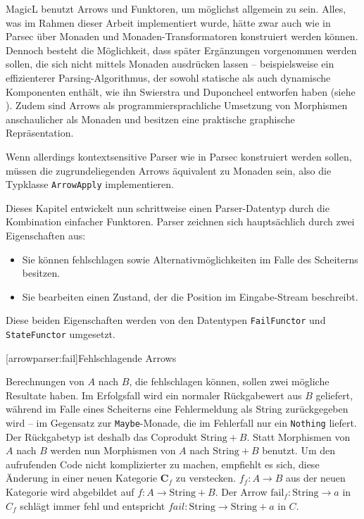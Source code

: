 \documentclass[11pt, a4paper, bibgerm]{scrbook}
\newcommand\icode[1]{\lstinline?#1?}
\newcommand\lsection{}
\begin{document}
MagicL benutzt Arrows und Funktoren, um möglichst allgemein zu
sein. Alles, was im Rahmen dieser Arbeit implementiert wurde, hätte zwar
auch wie in Parsec über Monaden und Monaden-Transformatoren konstruiert
werden können. Dennoch besteht die Möglichkeit, dass später Ergänzungen
vorgenommen werden sollen, die sich nicht mittels Monaden ausdrücken
lassen -- beispielsweise ein effizienterer Parsing-Algorithmus, der
sowohl statische als auch dynamische Komponenten enthält, wie ihn
Swierstra und Duponcheel entworfen haben (siehe
\cite[S. 8ff]{Hughes}). Zudem sind Arrows als programmiersprachliche
Umsetzung von Morphismen anschaulicher als Monaden und besitzen eine
praktische graphische Repräsentation.

Wenn allerdings kontextsensitive Parser wie in Parsec konstruiert werden
sollen, müssen die zugrundeliegenden Arrows äquivalent zu Monaden sein,
also die Typklasse \icode{ArrowApply} implementieren.

Dieses Kapitel entwickelt nun schrittweise einen Parser-Datentyp durch
die Kombination einfacher Funktoren. Parser zeichnen sich hauptsächlich
durch zwei Eigenschaften aus:
\begin{itemize}
\item Sie können fehlschlagen sowie Alternativmöglichkeiten im Falle des
  Scheiterns besitzen.
\item Sie bearbeiten einen Zustand, der die Position im Eingabe-Stream
  beschreibt.
\end{itemize}
Diese beiden Eigenschaften werden von den Datentypen \icode{FailFunctor}
und \icode{StateFunctor} umgesetzt.

\lsection[arrowparser:fail]{Fehlschlagende Arrows}

Berechnungen von $A$ nach $B$, die fehlschlagen können, sollen zwei
mögliche Resultate haben. Im Erfolgsfall wird ein normaler Rückgabewert
aus $B$ geliefert, während im Falle eines Scheiterns eine Fehlermeldung
als String zurückgegeben wird -- im Gegensatz zur \icode{Maybe}-Monade,
die im Fehlerfall nur ein \icode{Nothing} liefert. Der Rückgabetyp ist
deshalb das Coprodukt $\mathrm{String}+B$. Statt Morphismen von $A$ nach
$B$ werden nun Morphismen von $A$ nach $\mathrm{String}+B$ benutzt. Um
den aufrufenden Code nicht komplizierter zu machen, empfiehlt es sich,
diese Änderung in einer neuen Kategorie $\mathbf{C}_f$ zu
verstecken. $f_{f} : A \rightarrow B$ aus der neuen Kategorie wird
abgebildet auf $f : A \rightarrow \mathrm{String} + B$. Der Arrow
$\mathrm{fail}_{f} : \mathrm{String} \rightarrow a$ in $C_{f}$ schlägt
immer fehl und entspricht $fail : \mathrm{String} \rightarrow
\mathrm{String} + a$ in $C$.
\end{document}
